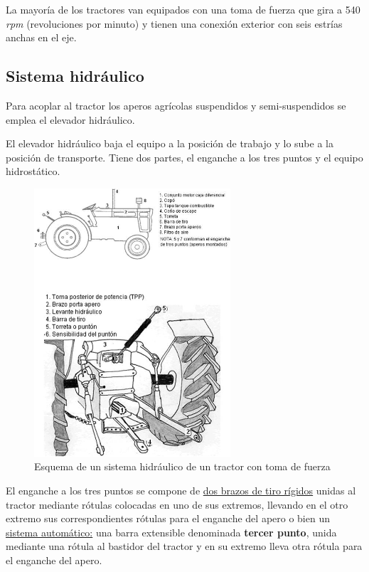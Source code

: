 \documentclass[a4paper,12pt,oneside]{book}
\begin{document}
La mayoría de los tractores van equipados con una toma de fuerza que gira a 540
\emph{rpm} (revoluciones por minuto) y tienen una conexión exterior con seis estrías
anchas en el eje. 

\newpage
\subsection{Sistema hidráulico}
\label{sec:org56c90d3}
Para acoplar al tractor los aperos agrícolas suspendidos y semi-suspendidos se
emplea el elevador hidráulico.

El elevador hidráulico baja el equipo a la posición de trabajo y lo sube a la
posición de transporte. Tiene dos partes, el enganche a los tres puntos y el
equipo hidrostático.
\begin{figure}[htbp]
\centering
\includegraphics[width=0.65\textwidth]{./img_0009/hidraulico.jpg}
\caption{Esquema de un sistema hidráulico de un tractor con toma de fuerza}
\end{figure}

El enganche a los tres puntos se compone de \uline{dos brazos de tiro rígidos} unidas
al tractor mediante rótulas colocadas en uno de sus extremos, llevando en el
otro extremo sus correspondientes rótulas para el enganche del apero o bien un
\uline{sistema automático:} una barra extensible denominada \textbf{tercer punto}, unida
mediante una rótula al bastidor del tractor y en su extremo lleva otra rótula
para el enganche del apero.
\end{document}

